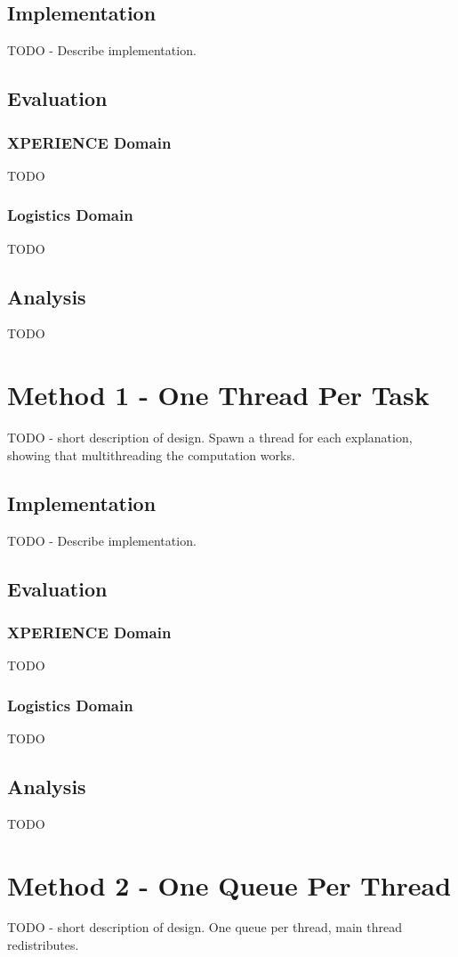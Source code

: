 \documentclass[12pt,twoside,abbrevs,msc,ai,notimes,logo,sansheadings]{infthesis}
\begin{document}
  \section {Implementation}
  TODO - Describe implementation.
  \section{Evaluation}
  \subsection{XPERIENCE Domain}
  TODO
  \subsection{Logistics Domain}
  TODO
  \section{Analysis}
  TODO
  
  \chapter {Method 1 - One Thread Per Task}
  TODO - short description of design. Spawn a thread for each explanation, showing that multithreading the computation works.
  \section {Implementation}
  TODO - Describe implementation.
  \section{Evaluation}
  \subsection{XPERIENCE Domain}
  TODO
  \subsection{Logistics Domain}
  TODO
  \section{Analysis}
  TODO
  \chapter {Method 2 - One Queue Per Thread}
  TODO - short description of design. One queue per thread, main thread redistributes.
\end{document}
